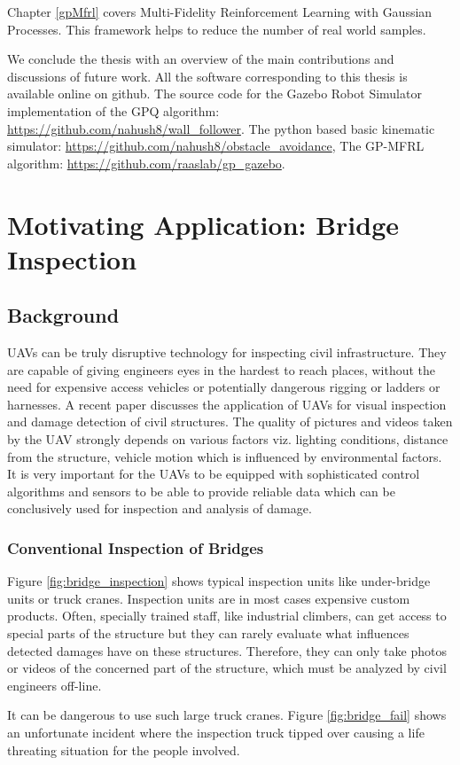 \documentclass[12pt]{report}
\begin{document}
Chapter \ref{gpMfrl} covers Multi-Fidelity Reinforcement Learning with Gaussian Processes. This framework helps to reduce the number of real world samples.\par 

We conclude the thesis with an overview of the main contributions and discussions of  future work. All the software corresponding to this thesis is available online on github. The source code for the Gazebo Robot Simulator implementation of the GPQ algorithm: \url{https://github.com/nahush8/wall_follower}. The python based basic kinematic simulator: \url{https://github.com/nahush8/obstacle_avoidance}, The GP-MFRL algorithm: \url{https://github.com/raaslab/gp_gazebo}.


\chapter{Motivating Application: Bridge Inspection}
\label{bridge_chapter}
\section{Background}
UAVs can be truly disruptive technology for inspecting civil infrastructure. They are capable of giving engineers eyes in the hardest to reach places, without the need for expensive access vehicles or potentially dangerous rigging or ladders or harnesses. A recent paper \cite{morgenthal2014quality} discusses the application of UAVs for visual inspection and damage detection of civil structures. The quality of pictures and videos taken by the UAV strongly depends on various factors viz. lighting conditions, distance from the structure, vehicle motion which is influenced by environmental factors. It is very important for the UAVs to be equipped with sophisticated control algorithms and sensors to be able to provide reliable data which can be conclusively used for inspection and analysis of damage.

\subsection{Conventional Inspection of Bridges}
Figure \ref{fig:bridge_inspection} shows typical inspection units like under-bridge units or truck cranes. Inspection units are in most cases expensive custom products. Often, specially trained staff, like industrial climbers, can get access to special parts of the structure but they can rarely evaluate what influences detected damages have on these structures. Therefore, they can only take photos or videos of the concerned part of the structure, which must be analyzed by civil engineers off-line.\par It can be dangerous to use such large truck cranes. Figure \ref{fig:bridge_fail} shows an unfortunate incident where the inspection truck tipped over causing a life threating situation for the people involved.\par
 
\end{document}
